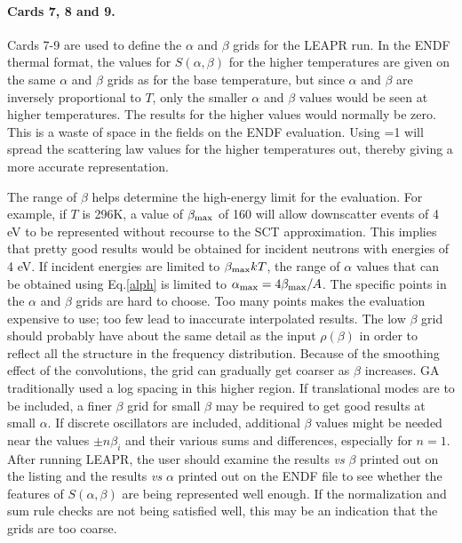 \paragraph{Cards 7, 8 and 9.}
Cards 7-9 are used to define the $\alpha$ and $\beta$ grids for
the LEAPR run.  In the ENDF thermal format, the values for
$S(\alpha,\beta)$ for the higher temperatures are given on the
same $\alpha$ and $\beta$ grids as for the base temperature, but
since $\alpha$ and $\beta$ are inversely proportional to $T$,
only the smaller $\alpha$ and $\beta$ values would be seen at
higher temperatures.  The results for the higher values would
normally be zero.  This is a waste of space in the fields on the
ENDF evaluation.  Using =1 will spread the scattering
law values for the higher temperatures out, thereby giving
a more accurate representation.

The range of $\beta$ helps determine the high-energy limit for the
evaluation.  For example, if $T$ is 296K, a value of $\beta_{\rm max}$
of 160 will allow downscatter events of 4 eV to be represented without
recourse to the SCT approximation.  This implies that pretty good
results would be obtained for incident neutrons with energies of 4 eV.
If incident energies are limited to $\beta_{\rm max}kT$, the range of
$\alpha$ values that can be obtained using Eq.\ref{alph} is limited
to $\alpha_{\rm max}=4\beta_{\rm max}/A$.  The specific points in the
$\alpha$ and $\beta$ grids are hard to choose.  Too many points makes
the evaluation expensive to use; too few lead to inaccurate
interpolated results.  The low $\beta$ grid should probably have about
the same detail as the input $\rho(\beta)$ in order to reflect all the
structure in the frequency distribution.  Because of the smoothing
effect of the convolutions, the grid can gradually get coarser as
$\beta$ increases.  GA traditionally used a log spacing in this higher
region.  If translational modes are to be included, a finer $\beta$
grid for small $\beta$ may be required to get good results at small
$\alpha$.  If discrete oscillators are included, additional $\beta$
values might be needed near the values $\pm n\beta_i$ and their
various sums and differences, especially for $n{=}1$.  After running
LEAPR, the user should examine the results {\it vs} $\beta$ printed out
on the listing and the results {\it vs} $\alpha$ printed out on the
ENDF file to see whether the features of $S(\alpha,\beta)$ are being
represented well enough.  If the normalization and sum rule checks are
not being satisfied well, this may be an indication that the grids are
too coarse.

